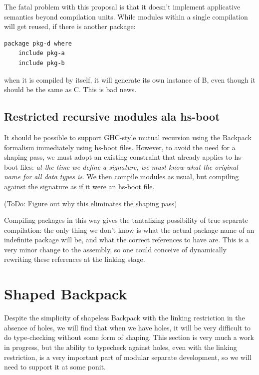 \documentclass{article}
\begin{document}
The fatal problem with this proposal is that it doesn't implement applicative
semantics beyond compilation units.  While modules within a single
compilation will get reused, if there is another package:

\begin{verbatim}
package pkg-d where
    include pkg-a
    include pkg-b
\end{verbatim}

when it is compiled by itself, it will generate its own instance of B,
even though it should be the same as C.  This is bad news.

\subsection{Restricted recursive modules ala hs-boot}\label{sec:hs-boot-restrict}

It should be possible to support GHC-style mutual recursion using the
Backpack formalism immediately using hs-boot files.  However, to avoid
the need for a shaping pass, we must adopt an existing constraint that
already applies to hs-boot files: \emph{at the time we define a signature,
we must know what the original name for all data types is}.  We then
compile modules as usual, but compiling against the signature as if it
were an hs-boot file.

(ToDo: Figure out why this eliminates the shaping pass)

Compiling packages in this way gives the tantalizing possibility
of true separate compilation: the only thing we don't know is what the actual
package name of an indefinite package will be, and what the correct references
to have are.  This is a very minor change to the assembly, so one could conceive
of dynamically rewriting these references at the linking stage.

\section{Shaped Backpack}

Despite the simplicity of shapeless Backpack with the linking
restriction in the absence of holes, we will find that when we have
holes, it will be very difficult to do type-checking without
some form of shaping.  This section is very much a work in progress,
but the ability to typecheck against holes, even with the linking restriction,
is a very important part of modular separate development, so we will need
to support it at some ponit.
\end{document}
